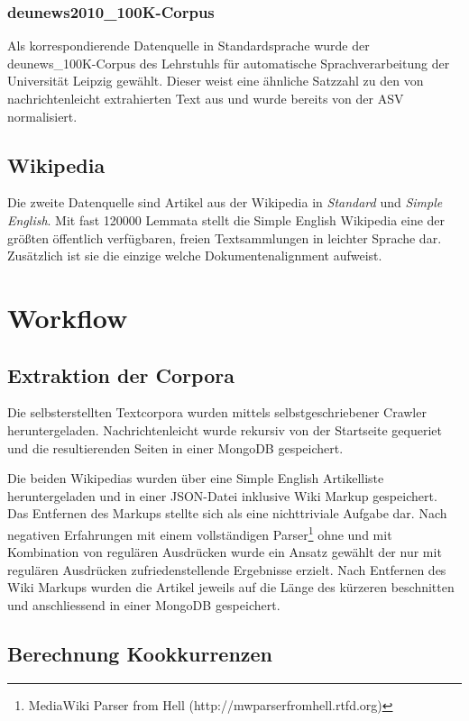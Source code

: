 \documentclass[12pt, a4paper]{article}
\begin{document}
\subsubsection{deunews2010\_100K-Corpus}

Als korrespondierende Datenquelle in Standardsprache wurde der
deunews\_100K-Corpus des Lehrstuhls f\"ur automatische Sprachverarbeitung
der Universit\"at Leipzig gew\"ahlt. Dieser weist eine \"ahnliche Satzzahl zu
den von nachrichtenleicht extrahierten Text aus und wurde bereits von der ASV
normalisiert.

\subsection{Wikipedia}

Die zweite Datenquelle sind Artikel aus der Wikipedia in \emph{Standard} und
\emph{Simple English}. Mit fast 120000 Lemmata stellt die Simple English
Wikipedia eine der gr\"o\ss{}ten \"offentlich verf\"ugbaren, freien
Textsammlungen in leichter Sprache dar. Zus\"atzlich ist sie die einzige
welche Dokumentenalignment aufweist.

\section{Workflow}
\subsection{Extraktion der Corpora}

Die selbsterstellten Textcorpora wurden mittels selbstgeschriebener Crawler
heruntergeladen. Nachrichtenleicht wurde rekursiv von der Startseite gequeriet
und die resultierenden Seiten in einer MongoDB gespeichert. 

Die beiden Wikipedias wurden \"uber eine Simple English Artikelliste
heruntergeladen und in einer JSON-Datei inklusive Wiki Markup gespeichert. Das
Entfernen des Markups stellte sich als eine nichttriviale Aufgabe dar. Nach
negativen Erfahrungen mit einem vollst\"andigen Parser\footnote{MediaWiki
Parser from Hell (http://mwparserfromhell.rtfd.org)} ohne und mit Kombination
von regul\"aren Ausdr\"ucken wurde ein Ansatz gew\"ahlt der nur mit regul\"aren
Ausdr\"ucken zufriedenstellende Ergebnisse erzielt. Nach Entfernen des Wiki
Markups wurden die Artikel jeweils auf die L\"ange des k\"urzeren beschnitten
und anschliessend in einer MongoDB gespeichert.

\subsection{Berechnung Kookkurrenzen}
\end{document}
